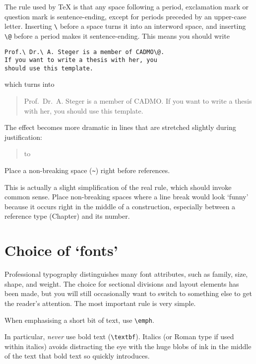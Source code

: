 The rule used by \TeX{} is that any space following a period,
exclamation mark or question mark is sentence-ending, except for
periods preceded by an upper-case letter.  Inserting \lstinline-\-
before a space turns it into an interword space, and inserting
\lstinline-\@- before a period makes it sentence-ending.  This means
you should write
\begin{lstlisting}
Prof.\ Dr.\ A. Steger is a member of CADMO\@.
If you want to write a thesis with her, you
should use this template.
\end{lstlisting}
which turns into
\begin{quote}
  Prof.\ Dr.\ A. Steger is a member of CADMO\@.  If you want to write
  a thesis with her, you should use this template.
\end{quote}
The effect becomes more dramatic in lines that are stretched slightly
during justification:
\begin{quote}
  \parbox{\linewidth}{\hbox to \linewidth{%
      Prof.\ Dr.\ A. Steger is a member of CADMO\@.  If you}}
\end{quote}

\begin{Rule}
  Place a non-breaking space (\lstinline-~-) right before references.
\end{Rule}

This is actually a slight simplification of the real rule, which
should invoke common sense.  Place non-breaking spaces where a line
break would look `funny' because it occurs right in the middle of a
construction, especially between a reference type (Chapter) and its
number.

\section{Choice of `fonts'}

Professional typography distinguishes many font attributes, such as
family, size, shape, and weight.  The choice for sectional divisions
and layout elements has been made, but you will still occasionally
want to switch to something else to get the reader's attention.  The
most important rule is very simple.

\begin{Rule}
  When emphasising a short bit of text, use \lstinline-\emph-.
\end{Rule}

In particular, \emph{never} use bold text (\lstinline-\textbf-).
Italics (or Roman type if used within italics) avoids distracting the
eye with the huge blobs of ink in the middle of the text that bold
text so quickly introduces.

